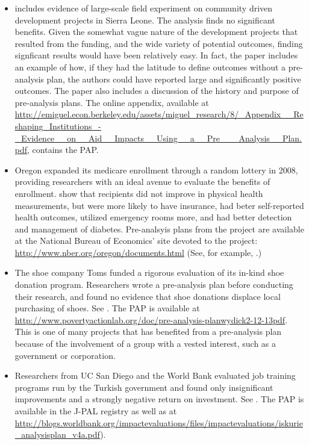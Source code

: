 \documentclass[12pt] {article}
\begin{document}
\begin{itemize}
\item 
 \cite{casey_reshaping_2012} includes evidence of large-scale field experiment on community driven development projects in Sierra Leone. The analysis finds no significant benefits. Given the somewhat vague nature of the development projects that resulted from the funding, and the wide variety of potential outcomes, finding signficant results would have been relatively easy. In fact, the paper includes an example of how, if they had the latitude to define outcomes without a pre-analysis plan, the authors could have reported large and significantly positive outcomes. The paper also includes a discussion of the history and purpose of pre-analysis plans. The online appendix, available at \url{http://emiguel.econ.berkeley.edu/assets/miguel_research/8/_Appendix__Reshaping_Institutions_-_Evidence__on__Aid__Impacts__Using__a__Pre___Analysis__Plan.pdf},
contains the PAP.


\item 
Oregon expanded its medicare enrollment through a random lottery in 2008, providing researchers with an ideal avenue to evaluate the benefits of enrollment. \cite{finkelstein_oregon_2012, Taubman17012014, doi:10.1056/NEJMsa1212321} show that recipients did not improve in physical health measurements, but were more likely to have insurance, had beter self-reported health outcomes, utilized emergency rooms more, and had better detection and management of diabetes. Pre-analsyis plans from the project are available at the National Bureau of Economics' site devoted to the project: \url{http://www.nber.org/oregon/documents.html} (See, for example, \cite{taubman_oregon_2013, baicker_katherine_oregon_2014}.)


\item
The shoe company Toms funded a rigorous evaluation of its in-kind shoe donation program. Researchers wrote a pre-analysis plan before conducting their research, and found no evidence that shoe donations displace local purchasing of shoes. See \cite{wydick_-kind_2014, katz_elizabeth_pre-analysis_2013}. The PAP is available at \url{http://www.povertyactionlab.org/doc/pre-analysis-planwydick2-12-13pdf}. This is one of many projects that has benefited from a pre-analysis plan because of the involvement of a group with a vested interest, such as a government or corporation.

\item
Researchers from UC San Diego and the World Bank evaluated job training programs run by the Turkish government and found only insignificant improvements and a strongly negative return on investment. See \cite{almeida_impact_2012, vocationalTurkey}. The PAP is available in the J-PAL registry as well as at
\url{http://blogs.worldbank.org/impactevaluations/files/impactevaluations/iskurie_analysisplan_v4a.pdf}).



\end{itemize}
\end{document}
